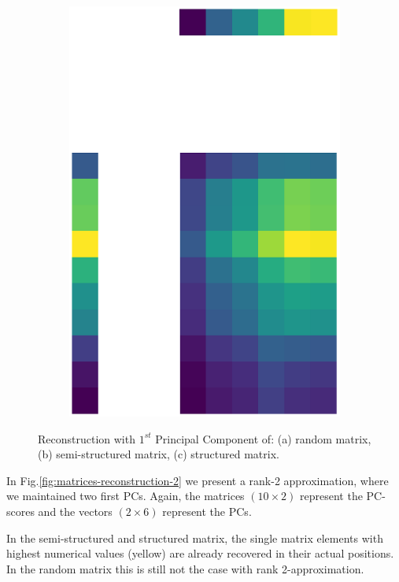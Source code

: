 \documentclass[10pt,twocolumn]{article}
\begin{document}
\begin{figure}[H]
\begin{subfigure}[t]{.15\textwidth}
\includegraphics[scale=.2]{DWGs/structured-matrix-reconstruction-PCs-1.eps}
\caption{ }
\end{subfigure}
\caption{Reconstruction with $1^{st}$ Principal Component of: (a) random matrix, (b) semi-structured matrix, (c) structured matrix.}
\label{fig:matrices-reconstruction-1}
\end{figure}

In Fig.\ref{fig:matrices-reconstruction-2} we present a rank-2 approximation, where we maintained two first PCs. Again, the matrices $(10 \times 2)$ represent the PC-scores and the vectors $(2 \times 6)$ represent the PCs.

In the semi-structured and structured matrix, the single matrix elements with highest numerical values (yellow) are already recovered in their actual positions. In the random matrix this is still not the case with rank 2-approximation.
\end{document}
